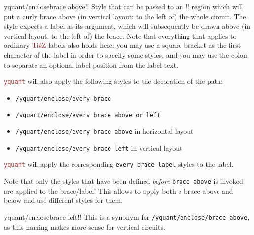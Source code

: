 \documentclass{scrartcl}
\makeatletter
\let\unpatched@minted@inline@iii=\minted@inline@iii%
\def\patched@minted@inline@iii#1{%
      \unpatched@minted@inline@iii{#1}%
      \par%
      \endgroup\egroup\nopagebreak\vskip-\parskip\nopagebreak%
      \noindent\ignorespaces%
   }
\def\patch@mintinline{%
      \let\minted@inline@iii=\patched@minted@inline@iii%
   }
\let\unpatched@RobustMintInlineProcess@ii=\RobustMintInlineProcess@ii
\def\patched@RobustMintInlineProcess@ii#1{%
      \unpatched@RobustMintInlineProcess@ii{#1}%
      \par%
      \endgroup\egroup\nopagebreak\vskip-\parskip\nopagebreak%
      \noindent\ignorespaces%
   }
\def\patch@mintinline{%
      \let\RobustMintInlineProcess@ii=\patched@RobustMintInlineProcess@ii%
   }
\newenvironment{option*}[3][]{\ifhmode\par\fi\addvspace{5mm}%
   \vbox\bgroup\begingroup%
      \patch@mintinline%
      \raggedleft%
      \hspace*{-1cm}%
      \phantomsection\label{yquant:/#2/#3}%
      \texttt{\ifstrempty{#1}\relax{\compat{#1}}\textcolor{gray}{/#2/}\textcolor{mintgreen}{#3}}\hfill default: %
      \tex}{\par\addvspace{5mm}}
\def\TikZ{\textcolor{brown}{Ti\textit kZ}}
\def\pkg#1{\textcolor{brown}{\texttt{#1}}}
\def\ttlink{\link\texttt}
\def\Yquant{\pkg{yquant}}
\makeatother
\begin{document}
            \begin{option*}{yquant/enclose}{brace above}!!
               Style that can be passed to an \tex!\encloseall! region which will put a curly brace above (in vertical layout: to the left of) the whole circuit.
               The style expects a label as its argument, which will subsequently be drawn above (in vertical layout: to the left of) the brace.
               Note that everything that applies to ordinary \TikZ{} labels also holds here: you may use a square bracket as the first character of the label in order to specify some styles, and you may use the colon to separate an optional label position from the label text.

               \Yquant{} will also apply the following styles to the decoration of the path:
               \begin{itemize}
                  \item \ttlink{/yquant/enclose/every brace}
                  \item \ttlink{/yquant/enclose/every brace above or left}
                  \item \ttlink{/yquant/enclose/every brace above} in horizontal layout
                  \item \ttlink{/yquant/enclose/every brace left} in vertical layout
               \end{itemize}

               \Yquant{} will apply the corresponding \texttt{every brace label} styles to the label.

               Note that only the styles that have been defined \emph{before} \texttt{brace above} is invoked are applied to the brace/label!
               This allows to apply both a brace above and below and use different styles for them.
            \end{option*}

            \begin{option*}{yquant/enclose}{brace left}!!
               This is a synonym for \ttlink{/yquant/enclose/brace above}, as this naming makes more sense for vertical circuits.
            \end{option*}
\end{document}
